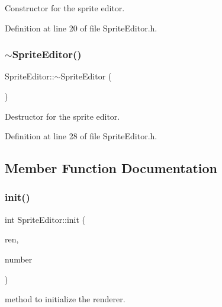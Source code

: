Constructor for the sprite editor. 



Definition at line 20 of file Sprite\+Editor.\+h.

\mbox{\label{class_sprite_editor_a12db2758dc012a376fae747d188825e0}} 
\subsubsection{\texorpdfstring{$\sim$SpriteEditor()}{~SpriteEditor()}}
{\footnotesize\ttfamily Sprite\+Editor\+::$\sim$\+Sprite\+Editor (\begin{DoxyParamCaption}{ }\end{DoxyParamCaption})\hspace{0.3cm}{\ttfamily [inline]}}



Destructor for the sprite editor. 



Definition at line 28 of file Sprite\+Editor.\+h.



\subsection{Member Function Documentation}
\mbox{\label{class_sprite_editor_a44b9278b996e26329ad9ac6bebccc006}} 
\subsubsection{\texorpdfstring{init()}{init()}}
{\footnotesize\ttfamily int Sprite\+Editor\+::init (\begin{DoxyParamCaption}\item[{\mbox{\hyperlink{_s_d_l__render_8h_aaf0bf7d020754fc614fe06552ea4d5d4}{S\+D\+L\+\_\+\+Renderer}} $\ast$}]{ren,  }\item[{int}]{number }\end{DoxyParamCaption})\hspace{0.3cm}{\ttfamily [inline]}}



method to initialize the renderer. 



